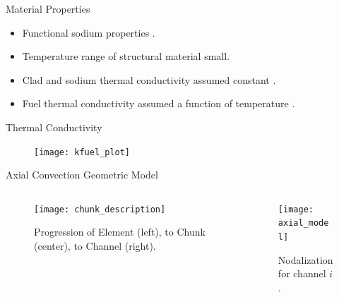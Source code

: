 \begin{frame}{Material Properties}
  \begin{itemize}
    \item Functional sodium properties \cite{sodiumProp}.
    \item Temperature range of structural material small. 
    \item Clad and sodium thermal conductivity assumed constant \cite{ht9Prop}.
    \item Fuel thermal conductivity assumed a function of temperature
      \cite{fuelProp}.
  \end{itemize}
\end{frame}

\begin{frame}{Thermal Conductivity}
  \begin{figure}
    \centering
    \texttt{[image: kfuel\_plot]}
    \label{fig:kfuel_plot}
  \end{figure}
\end{frame}

\begin{frame}{Axial Convection Geometric Model}
  \begin{columns}
    \begin{column}{0.5\textwidth}
      \begin{figure}
        \centering
        \texttt{[image: chunk\_description]}
        \caption{Progression of Element (left), to Chunk (center), to Channel
          (right).}
        \label{fig:chunk_description}
      \end{figure}
    \end{column}
    \begin{column}{0.5\textwidth}
      \begin{figure}
        \centering
        \texttt{[image: axial\_model]}
        \caption{Nodalization for channel $i$.}
        \label{fig:axial_model}
      \end{figure}
    \end{column}
  \end{columns}
\end{frame}

